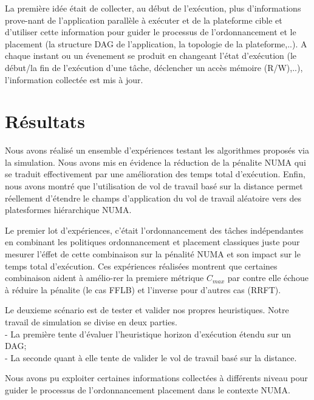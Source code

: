 La première idée était de collecter, au début de l'exécution, plus d'informations prove-nant de l’application parallèle à exécuter et de la plateforme cible et d'utiliser cette information pour guider le processus de l'ordonnancement et le placement (la structure DAG de l'application, la topologie de la plateforme,..). A chaque instant ou un évenement se produit en changeant l'état d'exécution (le début/la fin de l'exécution d'une tâche, déclencher un accès mémoire (R/W),..), l'information collectée est mis à jour.   
%
\section{Résultats}
%
Nous avons réalisé un ensemble d’expériences testant les algorithmes proposés via la simulation. 
Nous avons mis en évidence la réduction de la pénalite NUMA qui se traduit effectivement par une amélioration des temps total d'exécution. 
Enfin, nous avons montré que l’utilisation de vol de travail basé sur la distance permet réellement d’étendre le champs d’application du vol de
travail aléatoire vers des platesformes hiérarchique NUMA.

Le premier lot d'expériences, c'était l'ordonnancement des tâches indépendantes en combinant les politiques ordonnancement et placement classiques juste pour mesurer l'éffet de cette combinaison sur la pénalité NUMA et son impact sur le temps total d'exécution.
Ces expériences réalisées montrent que certaines combinaison aident à amélio-rer la premiere métrique $C_{max}$ par contre elle échoue à réduire la pénalite (le cas FFLB) et l'inverse pour d'autres cas (RRFT).

Le deuxieme scénario est de tester et valider nos propres heuristiques. Notre travail de simulation se divise en deux
parties. \\
- La première tente d'évaluer l'heuristique horizon d'exécution étendu sur un DAG; \\
- La seconde quant à elle tente de valider le vol de travail basé sur la distance. 

Nous avons pu exploiter certaines informations collectées à différents niveau pour guider le processus de l'ordonnancement placement dans le contexte NUMA.  


